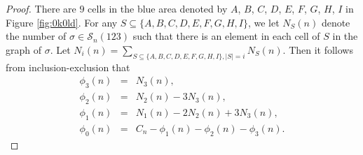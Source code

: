 \documentclass[
final,nomarks
]{dmtcs-episciences}
\newcommand{\fref}[1]{Figure \ref{fig:#1}}
\newcommand{\Sn}[1]{\mathcal{S}_{#1}}
\begin{document}
\begin{proof}
	There are \begin{math}9\end{math} cells in the blue area denoted by \begin{math}A\end{math}, \begin{math}B\end{math}, \begin{math}C\end{math}, \begin{math}D\end{math}, \begin{math}E\end{math}, \begin{math}F\end{math}, \begin{math}G\end{math}, \begin{math}H\end{math}, \begin{math}I\end{math} in \fref{0k0ld}. For any \begin{math}S \subseteq \{A,B,C,D,E,F,G,H,I\}\end{math}, we let 
	\begin{math}N_S(n)\end{math} denote the number of \begin{math}\sigma \in \Sn{n}(123)\end{math} such that there is an element in 
	each cell of \begin{math}S\end{math} in the graph of \begin{math}\sigma\end{math}.  
	Let \begin{math}N_i(n)=\sum_{S \subseteq \{A,B,C,D,E,F,G,H,I\},|S|=i}N_{S}(n)\end{math}. 
	Then it follows from inclusion-exclusion that 
	\begin{eqnarray}
		\phi_3(n)&=&N_3(n),\\
		\phi_2(n)&=&N_2(n)-3N_3(n),\\
		\phi_1(n)&=&N_1(n)-2N_2(n)+3N_3(n),\\
		\phi_0(n)&=&C_n-\phi_1(n)-\phi_2(n)-\phi_3(n).
	\end{eqnarray}
	

\end{proof}
\end{document}
